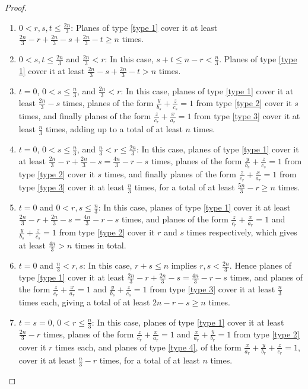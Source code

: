 \documentclass[usenames,dvipsnames, 11pt]{article}
\numberwithin{thm}{section}
\theoremstyle{definition}
\theoremstyle{definition}
\theoremstyle{definition}
\newcommand{\1}{\mathbf{1}}
\begin{document}
\begin{proof}
\begin{enumerate}
    \item $0 < r, s, t \leq \frac{2n}{3}$: Planes of type \ref{type 1} cover it at least $\frac{2n}{3} - r + \frac{2n}{3} - s + \frac{2n}{3} - t \geq n$ times.  
    \item $0 < s, t \leq \frac{2n}{3}$ and $\frac{2n}{3} < r$: In this case, $s + t \leq n - r < \frac{n}{3}$. Planes of type \ref{type 1} cover it at least $\frac{2n}{3} - s + \frac{2n}{3} - t > n$ times.  
    \item $t = 0$, $0 < s \leq \frac{n}{3}$, and $\frac{2n}{3} < r$: In this case, planes of type \ref{type 1} cover it at least $\frac{2n}{3} - s$ times, planes of the form $\frac{y}{b_s} + \frac{z}{c_s} = 1$ from type \ref{type 2} cover it $s$ times, and finally planes of the form $\frac{z}{c_r} + \frac{x}{a_r} = 1$ from type \ref{type 3} cover it at least $\frac{n}{3}$ times, adding up to a total of at least $n$ times.  
    \item $t = 0$, $0 < s \leq \frac{n}{3}$, and $\frac{n}{3} < r \leq \frac{2n}{3}$: In this case, planes of type \ref{type 1} cover it at least $\frac{2n}{3} - r + \frac{2n}{3} - s = \frac{4n}{3} - r - s$ times, planes of the form $\frac{y}{b_s} + \frac{z}{c_s} = 1$ from type \ref{type 2} cover it $s$ times, and finally planes of the form $\frac{z}{c_r} + \frac{x}{a_r} = 1$ from type \ref{type 3} cover it at least $\frac{n}{3}$ times, for a total of at least $\frac{5n}{3} - r \geq n$ times.  
    \item $t = 0$ and $0 < r, s \leq \frac{n}{3}$: In this case, planes of type \ref{type 1} cover it at least $\frac{2n}{3} - r + \frac{2n}{3} - s = \frac{4n}{3} - r - s$ times, and planes of the form $\frac{z}{c_r} + \frac{x}{a_r} = 1$ and $\frac{y}{b_s} + \frac{z}{c_s} = 1$ from type \ref{type 2} cover it $r$ and $s$ times respectively, which gives at least $\frac{4n}{3} > n$ times in total.  
    \item $t = 0$ and $\frac{n}{3} < r, s$: In this case, $r + s \leq n$ implies $r, s < \frac{2n}{3}$. Hence planes of type \ref{type 1} cover it at least $\frac{2n}{3} - r + \frac{2n}{3} - s = \frac{4n}{3} - r - s$ times, and planes of the form $\frac{z}{c_r} + \frac{x}{a_r} = 1$ and $\frac{y}{b_s} + \frac{z}{c_s} = 1$ from type \ref{type 3} cover it at least $\frac{n}{3}$ times each, giving a total of at least $2n - r - s \geq n$ times.  
    \item $t = s = 0$, $0 < r \leq \frac{n}{3}$: In this case, planes of type \ref{type 1} cover it at least $\frac{2n}{3} - r$ times, planes of the form $\frac{z}{c_r} + \frac{x}{a_r} = 1$ and $\frac{x}{a_r} + \frac{y}{b_r} = 1$ from type \ref{type 2} cover it $r$ times each, and planes of type \ref{type 4}, of the form $\frac{x}{a_r}+\frac{y}{b_r}+\frac{z}{c_r}=1$, cover it at least $\frac{n}{3} - r$ times, for a total of at least $n$ times.  

\end{enumerate}
\end{proof}
\end{document}
